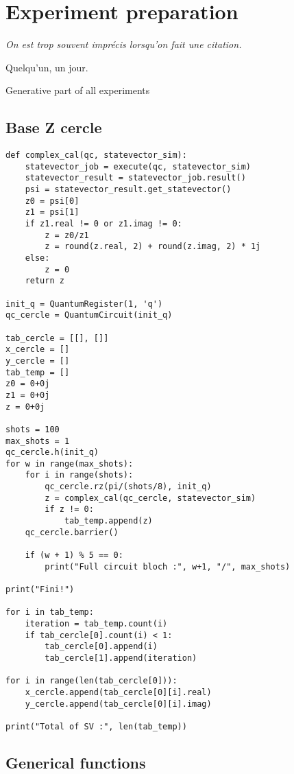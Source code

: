 \chapter{Experiment preparation}

\epigraph{\textit{On est trop souvent imprécis lorsqu'on fait une citation.}}{Quelqu'un, un jour.}

Generative part of all experiments

\section{Base Z cercle}

\begin{lstlisting}
def complex_cal(qc, statevector_sim):
    statevector_job = execute(qc, statevector_sim)
    statevector_result = statevector_job.result()
    psi = statevector_result.get_statevector()
    z0 = psi[0]
    z1 = psi[1]
    if z1.real != 0 or z1.imag != 0:
        z = z0/z1
        z = round(z.real, 2) + round(z.imag, 2) * 1j
    else:
        z = 0
    return z

init_q = QuantumRegister(1, 'q')
qc_cercle = QuantumCircuit(init_q)

tab_cercle = [[], []]
x_cercle = []
y_cercle = []
tab_temp = []
z0 = 0+0j
z1 = 0+0j
z = 0+0j

shots = 100
max_shots = 1
qc_cercle.h(init_q)
for w in range(max_shots):
    for i in range(shots):
        qc_cercle.rz(pi/(shots/8), init_q)
        z = complex_cal(qc_cercle, statevector_sim)
        if z != 0:
            tab_temp.append(z)
    qc_cercle.barrier()
    
    if (w + 1) % 5 == 0:
        print("Full circuit bloch :", w+1, "/", max_shots)

print("Fini!")

for i in tab_temp:
    iteration = tab_temp.count(i)
    if tab_cercle[0].count(i) < 1:
        tab_cercle[0].append(i)
        tab_cercle[1].append(iteration)

for i in range(len(tab_cercle[0])):
    x_cercle.append(tab_cercle[0][i].real)
    y_cercle.append(tab_cercle[0][i].imag)

print("Total of SV :", len(tab_temp))
\end{lstlisting}


\section{Generical functions}

